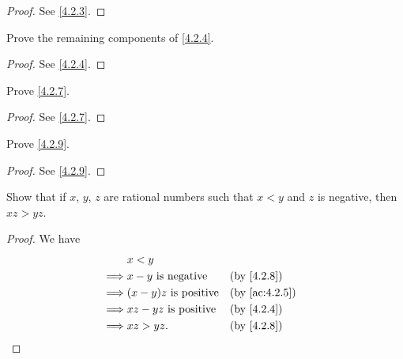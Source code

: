 \begin{proof}
  See \cref{4.2.3}.
\end{proof}

\begin{ex}\label{ex:4.2.3}
  Prove the remaining components of \cref{4.2.4}.
\end{ex}

\begin{proof}
  See \cref{4.2.4}.
\end{proof}

\begin{ex}\label{ex:4.2.4}
  Prove \cref{4.2.7}.
\end{ex}

\begin{proof}
  See \cref{4.2.7}.
\end{proof}

\begin{ex}\label{ex:4.2.5}
  Prove \cref{4.2.9}.
\end{ex}

\begin{proof}
  See \cref{4.2.9}.
\end{proof}

\begin{ex}\label{ex:4.2.6}
  Show that if \(x\), \(y\), \(z\) are rational numbers such that \(x < y\) and \(z\) is negative, then \(xz > yz\).
\end{ex}

\begin{proof}
  We have
  \begin{align*}
             & x < y                                           \\
    \implies & x - y \text{ is negative}    &  & \by{4.2.8}    \\
    \implies & (x - y)z \text{ is positive} &  & \by{ac:4.2.5} \\
    \implies & xz - yz \text{ is positive}  &  & \by{4.2.4}    \\
    \implies & xz > yz.                     &  & \by{4.2.8}
  \end{align*}
\end{proof}

